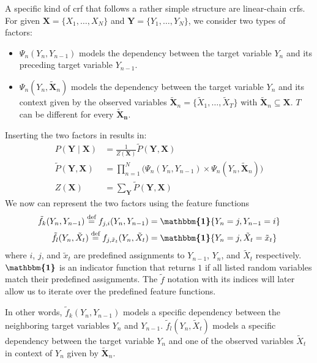 \bigskip

A specific kind of \gls{crf} that follows a rather simple structure are \glspl{linear-chain crf}.
For given $\bm{X}=\{X_1,\dots,X_N\}$ and $\bm{Y}=\{Y_1,\dots,Y_N\}$, we consider two types of \glspl{factor}:
\begin{itemize}
  \item $\Psi_n(Y_n,Y_{n-1})$ models the dependency between the \gls{target variable} $Y_n$ and its preceding \gls{target variable} $Y_{n-1}$.
  \item $\Psi_n(Y_n,\bm{\tilde{X}}_n)$ models the dependency between the \gls{target variable} $Y_n$ and its context given by the \glspl{observed variable} $\bm{\tilde{X}}_n=\{\tilde{X}_1,\dots,\tilde{X}_T\}$ with $\bm{\tilde{X}}_n\subseteq\bm{X}$.
    $T$ can be different for every $\bm{\tilde{X}_n}$.
\end{itemize}
Inserting the two factors in  results in:
\begin{equation}
  \label{equ:linear-chain-crf-factor}
  \begin{split}
    P(\bm{Y}\mid\bm{X}) & = \frac{1}{Z(\bm{X})}\tilde{P}(\bm{Y},\bm{X}) \\
    \tilde{P}(\bm{Y},\bm{X}) &= \prod_{n=1}^{N}\Big(\Psi_n(Y_n,Y_{n-1})\times\Psi_n(Y_n,\bm{\tilde{X}}_n)\Big) \\
    Z(\bm{X}) & = \sum_{\bm{Y}}\tilde{P}(\bm{Y},\bm{X})
  \end{split}
\end{equation}
We now can represent the two \glspl{factor} using the \glspl{feature function}
\begin{equation}
  \label{equ:linear-chain-crf-feature-functions}
  \begin{split}
    \tilde{f}_k(Y_n,Y_{n-1})\equalsdef f_{j,i}(Y_n,Y_{n-1}) & = \bm{\mathbbm{1}}\{Y_n=j,Y_{n-1}=i\}\\
    \tilde{f}_l(Y_n,\tilde{X}_t)\equalsdef f_{j,\tilde{x}_t}(Y_n,\tilde{X}_t) & = \bm{\mathbbm{1}}\{Y_n=j,\tilde{X}_t=\tilde{x}_t\}
  \end{split}
\end{equation}
where $i$, $j$, and $\tilde{x}_t$ are predefined assignments to $Y_{n-1}$, $Y_n$, and $\tilde{X}_t$ respectively. $\bm{\mathbbm{1}}$ is an indicator function that returns $1$ if all listed \glspl{random variable} match their predefined assignments.
The $\tilde{f}$ notation with its indices will later allow us to iterate over the predefined \glspl{feature function}.

In other words, $\tilde{f}_k(Y_n,Y_{n-1})$ models a specific dependency between the neighboring \glspl{target variable} $Y_n$ and $Y_{n-1}$. $\tilde{f}_l(Y_n,\tilde{X}_t)$ models a specific dependency between the \gls{target variable} $Y_n$ and one of the \glspl{observed variable} $\tilde{X}_t$ in context of $Y_n$ given by $\bm{\tilde{X}}_n$.

